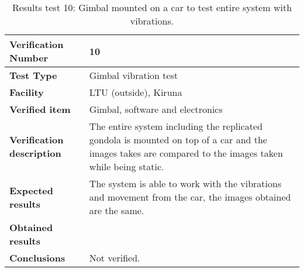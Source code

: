 \begin{table}[H]
\centering

\begin{tabular}{|m{}| m{} |}
\hline
\textbf{Verification Number} 		& 10 					\\ \hline
\textbf{Test Type} 					& Gimbal vibration test	\\ \hline
\textbf{Facility} 					& LTU (outside), Kiruna \\ \hline
\textbf{Verified item} 				& Gimbal, software and electronics \\ \hline

\textbf{Verification description} 	& The entire system including the replicated gondola is mounted on top of a car and the images takes are compared to the images taken while being static. \\ \hline

\textbf{Expected results} 			& The system is able to work with the vibrations and movement from the car, the images obtained are the same. \\ \hline

\textbf{Obtained results} 			& \\ \hline

\textbf{Conclusions} 				& Not verified.		\\ \hline
\end{tabular}
\caption{Results test 10: Gimbal mounted on a car to test entire system with vibrations.}
\label{tab:testresult10:gimbal-car}
\end{table}


\raggedbottom